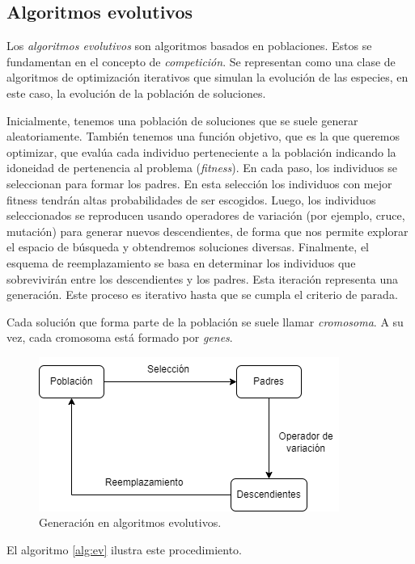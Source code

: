 \subsection{Algoritmos evolutivos}

Los \emph{algoritmos evolutivos} son algoritmos basados en poblaciones. Estos se fundamentan en el concepto de \emph{competición}. Se representan como una clase de algoritmos de optimización iterativos que simulan la evolución de las especies, en este caso, la evolución de la población de soluciones.

Inicialmente, tenemos una población de soluciones que se suele generar aleatoriamente. También tenemos una función objetivo, que es la que queremos optimizar, que evalúa cada individuo perteneciente a la población indicando la idoneidad de pertenencia al problema (\emph{fitness}). En cada paso, los individuos se seleccionan para formar los padres. En esta selección los individuos con mejor fitness tendrán altas probabilidades de ser escogidos. Luego, los individuos seleccionados se reproducen usando operadores de variación (por ejemplo, cruce, mutación) para generar nuevos descendientes, de forma que nos permite explorar el espacio de búsqueda y obtendremos soluciones diversas. Finalmente, el esquema de reemplazamiento se basa en determinar los individuos que sobrevivirán entre los descendientes y los padres. Esta iteración representa una generación. Este proceso es iterativo hasta que se cumpla el criterio de parada.

Cada solución que forma parte de la población se suele llamar \emph{cromosoma}. A su vez, cada cromosoma está formado por \emph{genes}.

\begin{figure}[H]   
	\center
	\includegraphics[scale=0.5]{figures/Algoritmos_evolutivos.png}
	\caption{Generación en algoritmos evolutivos.}
    \label{fg:alg_ev}
\end{figure}

El algoritmo \ref{alg:ev} ilustra este procedimiento.

